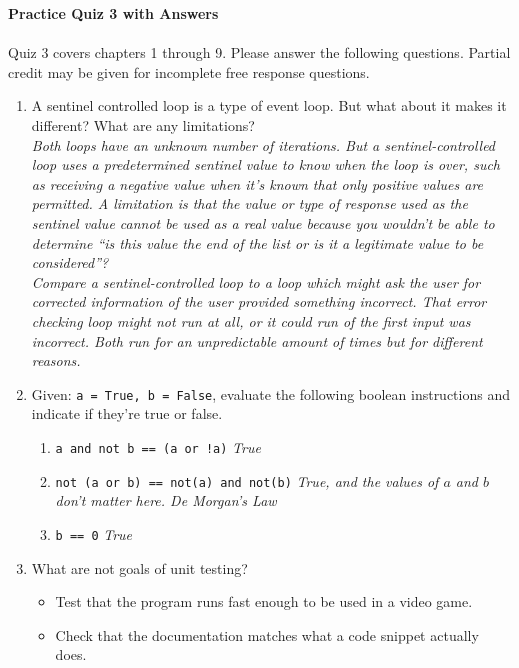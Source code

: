\documentclass[letter,10pt]{article}
\newcommand*\tick{\item[\Checkmark]}
\begin{document}
\huge
\textbf{Practice Quiz 3 with Answers}
\normalsize

\paragraph{}Quiz 3 covers chapters 1 through 9. Please answer the following questions. Partial credit may be given for incomplete free response questions.

\begin{enumerate}
    \item A sentinel controlled loop is a type of event loop. But what about it makes it different? What are any limitations? \\
    \textit{Both loops have an unknown number of iterations. But a sentinel-controlled loop uses a predetermined sentinel value to know when the loop is over, such as receiving a negative value when it's known that only positive values are permitted. A limitation is that the value or type of response used as the sentinel value cannot be used as a real value because you wouldn't be able to determine ``is this value the end of the list or is it a legitimate value to be considered''?} \\
    \textit{Compare a sentinel-controlled loop to a loop which might ask the user for corrected information of the user provided something incorrect. That error checking loop might not run at all, or it could run of the first input was incorrect. Both run for an unpredictable amount of times but for different reasons.}

    \item Given: \verb|a = True, b = False|, evaluate the following boolean instructions and indicate if they're true or false.
    \begin{enumerate}
        \item \verb|a and not b == (a or !a)| \textit{True}
        \item \verb|not (a or b) == not(a) and not(b)| \textit{True, and the values of $a$ and $b$ don't matter here. \textit{De Morgan's Law}}
        \item \verb|b == 0| \textit{True}
    \end{enumerate}

    \item What are not goals of unit testing?
    \begin{itemize}
        \tick Test that the program runs fast enough to be used in a video game.
        \tick Check that the documentation matches what a code snippet actually does.
    \end{itemize}


\end{enumerate}
\end{document}
